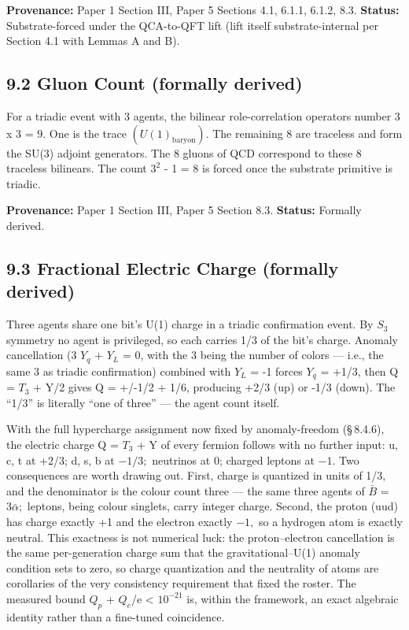 \documentclass[11pt,oneside]{report}
\theoremstyle{definition}
\theoremstyle{remark}
\begin{document}
\textbf{Provenance:} Paper 1 Section III, Paper 5 Sections 4.1, 6.1.1,
6.1.2, 8.3. \textbf{Status:} Substrate-forced under the QCA-to-QFT lift
(lift itself substrate-internal per Section 4.1 with Lemmas A and B).

\subsection*{9.2 Gluon Count (formally derived)}

For a triadic event with 3 agents, the bilinear role-correlation
operators number 3 x 3 = 9. One is the trace \ensuremath{(U(1)_{\mathrm{baryon}}).} The
remaining 8 are traceless and form the SU(3) adjoint generators. The 8
gluons of QCD correspond to these 8 traceless bilinears. The count
\ensuremath{3^{2}} - 1 = 8 is forced once the substrate primitive is triadic.

\textbf{Provenance:} Paper 1 Section III, Paper 5 Section 8.3.
\textbf{Status:} Formally derived.

\subsection*{9.3 Fractional Electric Charge (formally derived)}

Three agents share one bit's U(1) charge in a triadic confirmation
event. By \ensuremath{S_{3}} symmetry no agent is privileged, so each carries 1/3 of
the bit's charge. Anomaly cancellation (3 \ensuremath{Y_{q}} + \ensuremath{Y_{L}} = 0, with the 3
being the number of colors --- i.e., the same 3 as triadic confirmation)
combined with \ensuremath{Y_{L}} = -1 forces \ensuremath{Y_{q}} = +1/3, then Q = \ensuremath{T_{3}} + Y/2 gives Q
= +/-1/2 + 1/6, producing +2/3 (up) or -1/3 (down). The ``1/3'' is
literally ``one of three'' --- the agent count itself.

With the full hypercharge assignment now fixed by anomaly-freedom
(\S\,8.4.6), the electric charge Q = \ensuremath{T_{3}} + Y of every fermion follows with
no further input: u, c, t at +2/3; d, s, b at \ensuremath{-1/3;} neutrinos at 0;
charged leptons at \ensuremath{-1.} Two consequences are worth drawing out. First,
charge is quantized in units of 1/3, and the denominator is the colour
count three --- the same three agents of \ensuremath{\bar{B}} = \ensuremath{3\bar{\alpha};} leptons, being colour
singlets, carry integer charge. Second, the proton (uud) has charge
exactly +1 and the electron exactly \ensuremath{-1,} so a hydrogen atom is exactly
neutral. This exactness is not numerical luck: the proton--electron
cancellation is the same per-generation charge sum that the
gravitational--U(1) anomaly condition sets to zero, so charge
quantization and the neutrality of atoms are corollaries of the very
consistency requirement that fixed the roster. The measured bound
\textbar \ensuremath{Q_{p}} + \ensuremath{Q_{e}}\textbar/e \textless{} \ensuremath{10^{-21}} is, within the
framework, an exact algebraic identity rather than a fine-tuned
coincidence.
\end{document}
